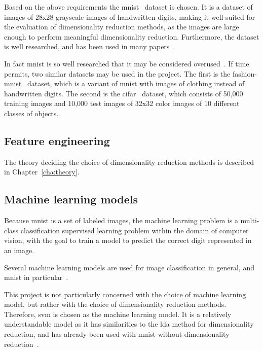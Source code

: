Based on the above requirements the \gls{mnist}~\cite{lecun-mnist-database} dataset is chosen. It is a dataset of images of 28x28 grayscale images of handwritten digits, making it well suited for the evaluation of dimensionality reduction methods, as the images are large enough to perform meaningful dimensionality reduction. Furthermore, the dataset is well researched, and has been used in many papers~\cite{lecun-mnist-database}.

In fact \gls{mnist} is so well researched that it may be considered overused~\cite{fashion-mnist}. If time permits, two similar datasets may be used in the project. The first is the \gls{fashion-mnist}~\cite{fashion-mnist} dataset, which is a variant of \gls{mnist} with images of clothing instead of handwritten digits. The second is the \gls{cifar}~\cite{krizhevsky-cifar} dataset, which consists of 50,000 training images and 10,000 test images of 32x32 color images of 10 different classes of objects.


\subsection{Feature engineering}\label{subsec:feature-engineering}
The theory deciding the choice of dimensionality reduction methods is described in Chapter~\ref{cha:theory}.


\subsection{Machine learning models}\label{subsec:machine-learning-models}
Because \gls{mnist} is a set of labeled images, the machine learning problem is a multi-class classification supervised learning problem within the domain of computer vision, with the goal to train a model to predict the correct digit represented in an image.

Several machine learning models are used for image classification in general, and \gls{mnist} in particular~\cite{lecun-mnist-database,IBM-computer-vision,convolutional-neural-networks-convnets,multi-column-neural-network-ciregan}.

This project is not particularly concerned with the choice of machine learning model, but rather with the choice of dimensionality reduction methods. Therefore, \gls{svm} is chosen as the machine learning model. It is a relatively understandable model as it has similarities to the \gls{lda} method for dimensionality reduction, and has already been used with \gls{mnist} without dimensionality reduction~\cite{lecun-mnist-database}.


